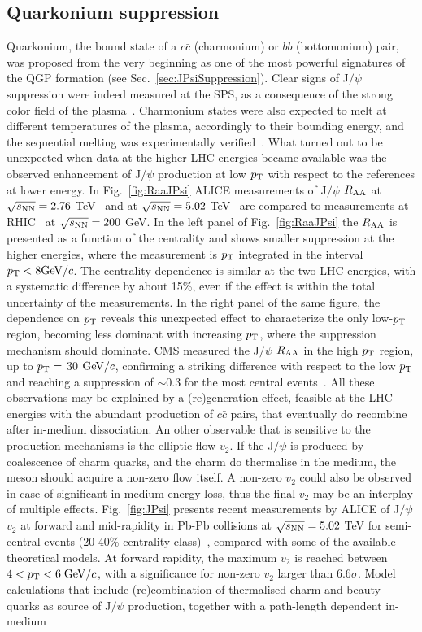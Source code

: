 \subsection{Quarkonium suppression}
Quarkonium, the bound state of a $c\bar{c}$ (charmonium) or $b\bar{b}$ (bottomonium) pair, was proposed from the very beginning as one of the most powerful signatures of the QGP formation (see Sec.~\ref{sec:JPsiSuppression}). Clear signs of J$/\psi$ suppression were indeed measured at the SPS, as a consequence of the strong color field of the plasma~\cite{Abreu:2000ni}. Charmonium states were also expected to melt at different temperatures of the plasma, accordingly to their bounding energy, and the sequential melting was experimentally verified~\cite{Du:2015wha,Digal:2001ue}. What turned out to be unexpected when data at the higher LHC energies became available was the observed enhancement of J$/\psi$ production at low $p_{\rm T}$ with respect to the references at lower energy. In Fig.~\ref{fig:RaaJPsi} ALICE measurements of J$/\psi$ $R_{\rm AA}$ at $\sqrt{s_{\rm NN}} = 2.76$ TeV~\cite{Abelev:2013ila} and at $\sqrt{s_{\rm NN}} = 5.02$ TeV~\cite{Adam:2016rdg} are compared to measurements at RHIC~\cite{Adare:2011yf} at $\sqrt{s_{\rm NN}} = 200$ GeV. In the left panel of Fig.~\ref{fig:RaaJPsi} the $R_{\rm AA}$ is presented as a function of the centrality and shows smaller suppression at the higher energies, where the measurement is $p_{\rm T}$ integrated in the interval $p_{\rm T} < 8 \mathrm{GeV}/c$. The centrality dependence is similar at the two LHC energies, with a systematic difference by about 15\%, even if the effect is within the total uncertainty of the measurements. In the right panel of the same figure, the dependence on $p_{\rm T}$ reveals this unexpected effect to characterize the only low-$p_{\rm T}$ region, becoming less dominant with increasing $p_{\rm T}$, where the suppression mechanism should dominate. CMS measured the J$/\psi$ $R_{\rm AA}$ in the high $p_{\rm T}$ region, up to $p_{\rm T} = $ 30 $\mathrm{GeV}/c$, confirming a striking difference with respect to the low $p_{\rm T}$ and reaching a suppression of $\sim 0.3$ for the most central events~\cite{Khachatryan:2016ypw}. All these observations may be explained by a (re)generation effect, feasible at the LHC energies with the abundant production of $c\bar{c}$ pairs, that eventually do recombine after in-medium dissociation. An other observable that is sensitive to the production mechanisms is the elliptic flow $v_2$. If the J$/\psi$ is produced by coalescence of charm quarks, and the charm do thermalise in the medium, the meson should acquire a non-zero flow itself. A non-zero $v_2$ could also be observed in case of significant in-medium energy loss, thus the final $v_2$ may be an interplay of multiple effects. Fig.~\ref{fig:JPsi} presents recent measurements by ALICE of J$/\psi$ $v_2$ at forward and mid-rapidity in Pb-Pb collisions at $\sqrt{s_{\rm NN}} = 5.02$ TeV for semi-central events (20-40\% centrality class)~\cite{Acharya:2017tgv}, compared with some of the available theoretical models. At forward rapidity, the maximum $v_2$ is reached between $4 < p_{\rm T} < 6\; \mathrm{GeV}/c$, with a significance for non-zero $v_2$ larger than $6.6\sigma$. Model calculations that include (re)combination of thermalised charm and beauty quarks as source of J$/\psi$ production, together with a path-length dependent in-medium 
